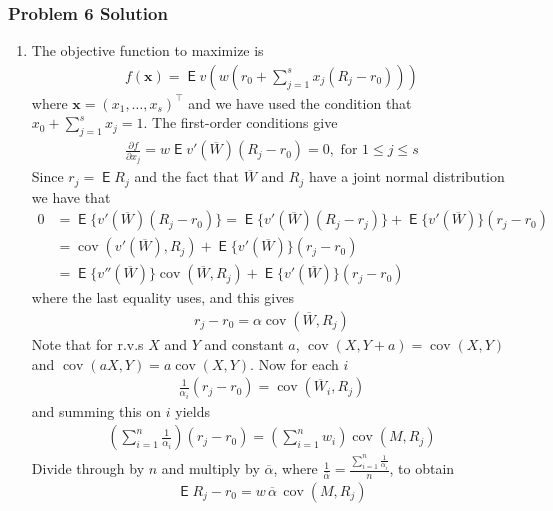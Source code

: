 \documentclass[10pt,handout]{beamer}
\newcommand{\ds}{\displaystyle}
\DeclareMathOperator\expc{\mathsf{E}}
\DeclareMathOperator\cov{cov}
\theoremstyle{definition}
\begin{document}
\begin{frame}[allowframebreaks]
  \frametitle{Problem 6 Solution}
  \begin{enumerate}
    \item The objective function to maximize is
      \begin{align*}
        f(\mathbf{x}) = \expc v\left(w\left(r_0 + \sum_{j=1}^s x_j(R_j - r_0)\right)\right)
      \end{align*}
      where $\mathbf{x} = (x_1,\ldots,x_s)^\top$ and we have used the condition that $x_0 + \sum_{j=1}^s x_j = 1$. The first-order conditions give
      \begin{align*}
        \frac{\partial f}{\partial x_j} = w\expc{v'(\overline{W})(R_j - r_0)} = 0, \text{ for } 1 \leqslant j \leqslant s
      \end{align*}
      Since $r_j = \expc{R_j}$ and the fact that $\overline{W}$ and $R_j$ have a joint normal distribution we have that
      \begin{align*}
        0 &= \expc\big\{v'(\overline{W})(R_j - r_0)\big\} = \expc\big\{v'(\overline{W})(R_j - r_j)\big\} + \expc\big\{v'(\overline{W})\big\}(r_j - r_0) \\
          &= \cov(v'(\overline{W}), R_j) + \expc\big\{v'(\overline{W})\big\}(r_j - r_0) \\
          &= \expc\big\{v''(\overline{W})\big\}\cov(\overline{W}, R_j) + \expc\big\{v'(\overline{W})\big\}(r_j - r_0)
        \end{align*}
      where the last equality uses, and this gives
      \begin{align*}
        r_j - r_0 = \alpha \cov(\overline{W}, R_j)
      \end{align*}
      Note that for r.v.s $X$ and $Y$ and constant $a$, $\cov(X, Y + a) = \cov(X, Y)$ and $\cov(aX, Y) = a\cov(X,Y)$. Now for each $i$
      \begin{align*}
        \frac{1}{\alpha_i}(r_j - r_0) = \cov(\overline{W}_i, R_j)
      \end{align*}
      and summing this on $i$ yields
      \begin{align*}
        \left(\sum_{i=1}^n\frac{1}{\alpha_i}\right)(r_j - r_0) = \left(\sum_{i=1}^n w_i\right)\cov(M, R_j)
      \end{align*}
      Divide through by $n$ and multiply by $\overline{\alpha}$, where $\ds\frac{1}{\overline{\alpha}} = \frac{\sum_{i=1}^n\frac{1}{\alpha_i}}{n}$, to obtain
      \begin{align}\label{eq:m0}
        \expc{R_j} - r_0 = w\,\overline{\alpha}\,\cov(M, R_j)

\end{align}
\end{enumerate}
\end{frame}
\end{document}
